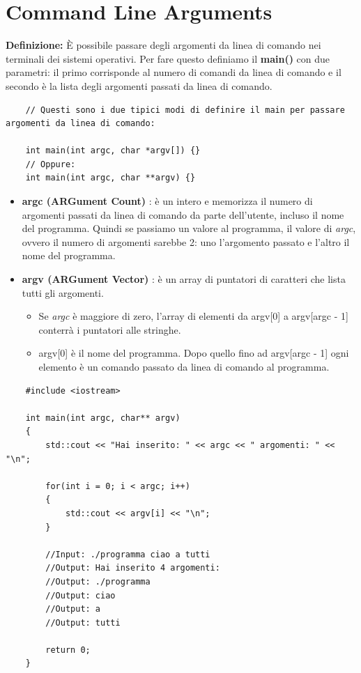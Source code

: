 
\newpage

\section{Command Line Arguments}

\textsf{\small \textbf{Definizione: } È possibile passare degli argomenti da linea di comando nei terminali dei sistemi operativi. Per fare questo definiamo il \textbf{main()} con due parametri: il primo corrisponde al numero di comandi da linea di comando e il secondo è la lista degli argomenti passati da linea di comando.} \\

\begin{lstlisting}
	// Questi sono i due tipici modi di definire il main per passare argomenti da linea di comando:
	
	int main(int argc, char *argv[]) {}
	// Oppure:
	int main(int argc, char **argv) {} 
\end{lstlisting}

\begin{itemize}
	\item \textsf{\small \textbf{argc (ARGument Count)} : è un intero e memorizza il numero di argomenti passati da linea di comando da parte dell'utente, incluso il nome del programma. Quindi se passiamo un valore al programma, il valore di \emph{argc}, ovvero il numero di argomenti sarebbe 2: uno l'argomento passato e l'altro il nome del programma.} \\
	\item \textsf{\small \textbf{argv (ARGument Vector)} : è un array di puntatori di caratteri che lista tutti gli argomenti.} \\
	\begin{itemize}
		\item \textsf{\small Se \emph{argc} è maggiore di zero, l'array di elementi da argv[0] a argv[argc - 1] conterrà i puntatori alle stringhe.}
		\item \textsf{\small argv[0] è il nome del programma. Dopo quello fino ad argv[argc - 1] ogni elemento è un comando passato da linea di comando al programma.}
	\end{itemize}
\end{itemize}

\begin{lstlisting}
	#include <iostream>
	
	int main(int argc, char** argv)
	{
		std::cout << "Hai inserito: " << argc << " argomenti: " << "\n";
		
		for(int i = 0; i < argc; i++)
		{
			std::cout << argv[i] << "\n";
		}
		
		//Input: ./programma ciao a tutti
		//Output: Hai inserito 4 argomenti:
		//Output: ./programma
		//Output: ciao
		//Output: a
		//Output: tutti
		
		return 0;
	}
\end{lstlisting}

